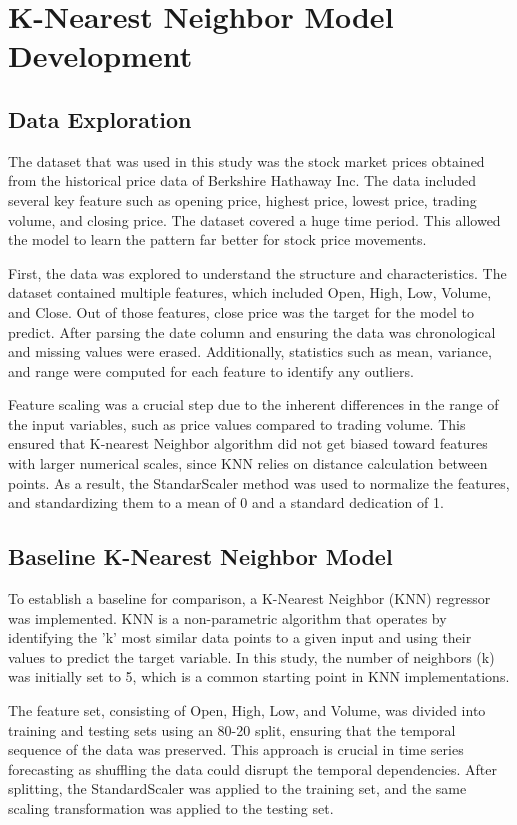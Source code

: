 \documentclass[conference]{IEEEtran}
\begin{document}
\section{K-Nearest Neighbor Model Development}

\subsection{Data Exploration}
The dataset that was used in this study was the stock market prices obtained from the historical price data of Berkshire Hathaway Inc. The data included several key feature such as opening price, highest price, lowest price, trading volume, and closing price. The dataset covered a huge time period. This allowed the model to learn the pattern far better for stock price movements.

First, the data was explored to understand the structure and characteristics. The dataset contained multiple features, which included Open, High, Low, Volume, and Close. Out of those features, close price was the target for the model to predict. After parsing the date column and ensuring the data was chronological and missing values were erased. Additionally, statistics such as mean, variance, and range were computed for each feature to identify any outliers.

Feature scaling was a crucial step due to the inherent differences in the range of the input variables, such as price values compared to trading volume. This ensured that K-nearest Neighbor algorithm did not get biased toward features with larger numerical scales, since KNN relies on distance calculation between points. As a result, the StandarScaler method was used to normalize the features, and standardizing them to a mean of 0 and a standard dedication of 1. 

\subsection{Baseline K-Nearest Neighbor Model}
To establish a baseline for comparison, a K-Nearest Neighbor (KNN) regressor was implemented. KNN is a non-parametric algorithm that operates by identifying the 'k' most similar data points to a given input and using their values to predict the target variable. In this study, the number of neighbors (k) was initially set to 5, which is a common starting point in KNN implementations.

The feature set, consisting of Open, High, Low, and Volume, was divided into training and testing sets using an 80-20 split, ensuring that the temporal sequence of the data was preserved. This approach is crucial in time series forecasting as shuffling the data could disrupt the temporal dependencies. After splitting, the StandardScaler was applied to the training set, and the same scaling transformation was applied to the testing set.
\end{document}
